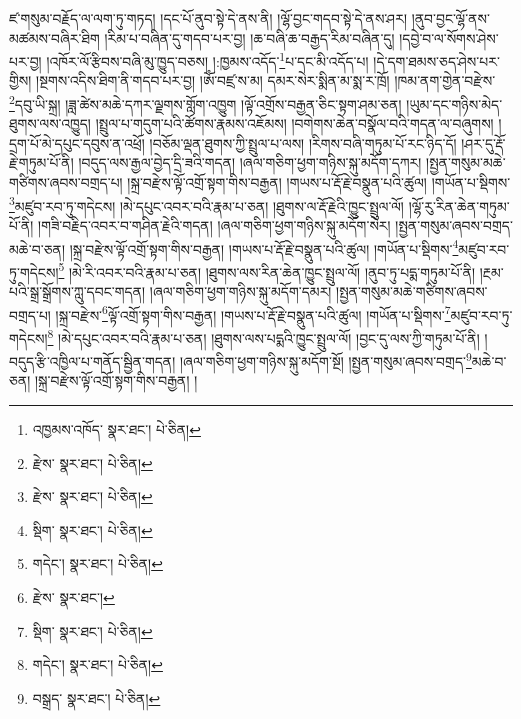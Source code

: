 ཛ་གསུམ་བརྗོད་ལ་ལག་ཏུ་གཏད། །དང་པོ་ནུབ་སྟེ་དེ་ནས་ནི། །ལྷོ་བྱང་གདབ་སྟེ་དེ་ནས་ཤར། །ནུབ་བྱང་ལྷོ་ནས་མཚམས་བཞིར་ཐིག །རིམ་པ་བཞིན་དུ་གདབ་པར་བྱ། །ཆ་བཞི་ཆ་བརྒྱད་རིམ་བཞིན་དུ། །དབྱེ་བ་ལ་སོགས་ཤེས་པར་བྱ། །འཁོར་ལོ་རྩིབས་བཞི་མུ་ཁྱུད་བཅས། །:ཁྱམས་འདོད་\footnote{འཁྱམས་འཁོད་  སྣར་ཐང་།  པེ་ཅིན། }པ་དང་མི་འདོད་པ། །དེ་དག་ཐམས་ཅད་ཤེས་པར་གྱིས། །སྔགས་འདིས་ཐིག་ནི་གདབ་པར་བྱ། །ཨོཾ་བཛྲ་ས་མ། དམར་སེར་སྨིན་མ་སྨ་ར་ཁྲོ། །ཁམ་ནག་གྱེན་བརྫེས་\footnote{རྫེས་  སྣར་ཐང་།  པེ་ཅིན། }དབུ་ཡི་སྐྲ། །ཟླ་ཚེས་མཆེ་དཀར་ལྗགས་གློག་འཁྱུག །ལྟོ་འགྲོས་བརྒྱན་ཅིང་སྟག་ཤམ་ཅན། །ཡུམ་དང་གཉིས་མེད་ཐུགས་ལས་འཁྱུད། །སྤྲུལ་པ་གདུག་པའི་ཚོགས་རྣམས་འཇོམས། །བགེགས་ཆེན་བསྣོལ་བའི་གདན་ལ་བཞུགས། །དྲག་པོ་མེ་དཔུང་དབུས་ན་འཕྲོ། །བཅོམ་ལྡན་ཐུགས་ཀྱི་སྤྲུལ་པ་ལས། །རིགས་བཞི་གཏུམ་པོ་རང་ཉིད་དོ། །ཤར་དུ་རྡོ་རྗེ་གཏུམ་པོ་ནི། །བདུད་ལས་རྒྱལ་བྱེད་དྲི་ཟའི་གདན། །ཞལ་གཅིག་ཕྱག་གཉིས་སྐུ་མདོག་དཀར། །སྤྱན་གསུམ་མཆེ་གཙིགས་ཞབས་བགྲད་པ། །སྐྲ་བརྫེས་ལྟོ་འགྲོ་སྟག་གིས་བརྒྱན། །གཡས་པ་རྡོ་རྗེ་བསྣུན་པའི་ཚུལ། །གཡོན་པ་སྡིགས་\footnote{རྫེས་  སྣར་ཐང་།  པེ་ཅིན། }མཛུབ་རབ་ཏུ་གདེངས། །མེ་དཔུང་འབར་བའི་རྣམ་པ་ཅན། །ཐུགས་ལ་རྡོ་རྗེའི་ཁྱུང་སྤྲུལ་ལོ། །ལྷོ་རུ་རིན་ཆེན་གཏུམ་པོ་ནི། །གཟི་བརྗིད་འབར་བ་གཤིན་རྗེའི་གདན། །ཞལ་གཅིག་ཕྱག་གཉིས་སྐུ་མདོག་སེར། །སྤྱན་གསུམ་ཞབས་བགྲད་མཆེ་བ་ཅན། །སྐྲ་བརྫེས་ལྟོ་འགྲོ་སྟག་གིས་བརྒྱན། །གཡས་པ་རྡོ་རྗེ་བསྣུན་པའི་ཚུལ། །གཡོན་པ་སྡིགས་\footnote{སྡིག་  སྣར་ཐང་།  པེ་ཅིན། }མཛུབ་རབ་ཏུ་གདེངས།\footnote{གདེང་།  སྣར་ཐང་།  པེ་ཅིན། } །མེ་རི་འབར་བའི་རྣམ་པ་ཅན། །ཐུགས་ལས་རིན་ཆེན་ཁྱུང་སྤྲུལ་ལོ། །ནུབ་ཏུ་པདྨ་གཏུམ་པོ་ནི། །རྔམ་པའི་སྒྲ་སྒྲོགས་ཀླུ་དབང་གདན། །ཞལ་གཅིག་ཕྱག་གཉིས་སྐུ་མདོག་དམར། །སྤྱན་གསུམ་མཆེ་གཙིགས་ཞབས་བགྲད་པ། །སྐྲ་བརྫེས་\footnote{རྫེས་  སྣར་ཐང་། }ལྟོ་འགྲོ་སྟག་གིས་བརྒྱན། །གཡས་པ་རྡོ་རྗེ་བསྣུན་པའི་ཚུལ། །གཡོན་པ་སྡིགས་\footnote{སྡིག་  སྣར་ཐང་།  པེ་ཅིན། }མཛུབ་རབ་ཏུ་གདེངས།\footnote{གདེང་།  སྣར་ཐང་།  པེ་ཅིན། } །མེ་དཔུང་འབར་བའི་རྣམ་པ་ཅན། །ཐུགས་ལས་པདྨའི་ཁྱུང་སྤྲུལ་ལོ། །བྱང་དུ་ལས་ཀྱི་གཏུམ་པོ་ནི། །བདུད་རྩི་འཁྱིལ་པ་གནོད་སྦྱིན་གདན། །ཞལ་གཅིག་ཕྱག་གཉིས་སྐུ་མདོག་སྔོ། །སྤྱན་གསུམ་ཞབས་བགྲད་\footnote{བསྒྲད་  སྣར་ཐང་།  པེ་ཅིན། }མཆེ་བ་ཅན། །སྐྲ་བརྫེས་ལྟོ་འགྲོ་སྟག་གིས་བརྒྱན། །
